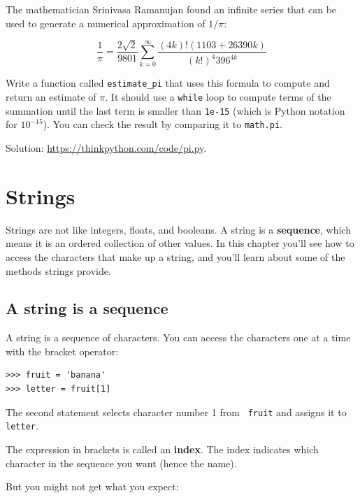 \documentclass[10pt]{book}
\begin{document}
\begin{exercise}

The mathematician Srinivasa Ramanujan found an
infinite series
that can be used to generate a numerical
approximation of $1 / \pi$:

\[ \frac{1}{\pi} = \frac{2\sqrt{2}}{9801}
\sum^\infty_{k=0} \frac{(4k)!(1103+26390k)}{(k!)^4 396^{4k}} \]

Write a function called \verb"estimate_pi" that uses this formula
to compute and return an estimate of $\pi$.  It should use a {\tt while}
loop to compute terms of the summation until the last term is
smaller than {\tt 1e-15} (which is Python notation for $10^{-15}$).
You can check the result by comparing it to {\tt math.pi}.

Solution: \url{https://thinkpython.com/code/pi.py}.

\end{exercise}


\chapter{Strings}
\label{strings}

Strings are not like integers, floats, and booleans.  A string
is a {\bf sequence}, which means it is
an ordered collection of other values.  In this chapter you'll see
how to access the characters that make up a string, and you'll
learn about some of the methods strings provide.


\section{A string is a sequence}

A string is a sequence of characters.
You can access the characters one at a time with the
bracket operator:

\begin{verbatim}
>>> fruit = 'banana'
>>> letter = fruit[1]
\end{verbatim}
%
The second statement selects character number 1 from {\tt
fruit} and assigns it to {\tt letter}.

The expression in brackets is called an {\bf index}.
The index indicates which character in the sequence you
want (hence the name).

But you might not get what you expect:
\end{document}
